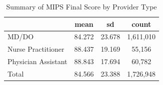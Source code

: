 \begin{table}[htbp]\centering
\def\sym#1{\ifmmode^{#1}\else\(^{#1}\)\fi}
\caption{Summary of MIPS Final Score by Provider Type}
\begin{tabular}{l*{1}{ccc}}
\toprule
                    &        mean&          sd&       count\\
\midrule
MD/DO               &      84.272&      23.678&   1,611,010\\
Nurse Practitioner  &      88.437&      19.169&      55,156\\
Physician Assistant &      88.843&      17.694&      60,782\\
Total               &      84.566&      23.388&   1,726,948\\
\bottomrule
\end{tabular}
\end{table}
